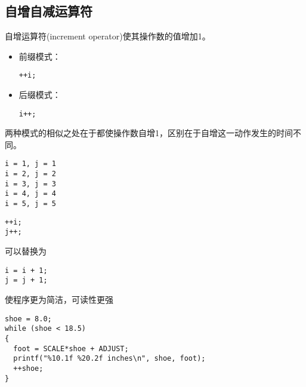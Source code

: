 \subsection{自增自减运算符}
\begin{frame}[fragile]
自增运算符(increment operator)使其操作数的值增加1。\vspace{0.1in}

\begin{itemize}
\item 前缀模式：
\begin{lstlisting}[backgroundcolor=\color{red!10},frame=no]
++i;
\end{lstlisting} 
\item 后缀模式：
\begin{lstlisting}[backgroundcolor=\color{red!10},frame=no]
i++;
\end{lstlisting} 
\end{itemize}
两种模式的相似之处在于都使操作数自增1，区别在于自增这一动作发生的时间不同。
\end{frame}

\begin{frame}[fragile]
  
\end{frame}

\begin{frame}[fragile]  
\begin{lstlisting}[backgroundcolor=\color{red!10},frame=no]
i = 1, j = 1
i = 2, j = 2
i = 3, j = 3
i = 4, j = 4
i = 5, j = 5
\end{lstlisting}    
\end{frame}


\begin{frame}[fragile]
\begin{lstlisting}[backgroundcolor=\color{red!10},frame=no]
++i;
j++;
\end{lstlisting}
可以替换为
\begin{lstlisting}[backgroundcolor=\color{red!10},frame=no]
i = i + 1;
j = j + 1;
\end{lstlisting} \pause 

\end{frame}

\begin{frame}[fragile]

使程序更为简洁，可读性更强

\begin{lstlisting}[backgroundcolor=\color{red!10},frame=no]
shoe = 8.0;
while (shoe < 18.5)
{
  foot = SCALE*shoe + ADJUST;
  printf("%10.1f %20.2f inches\n", shoe, foot);
  ++shoe;
}
\end{lstlisting}
\end{frame}

